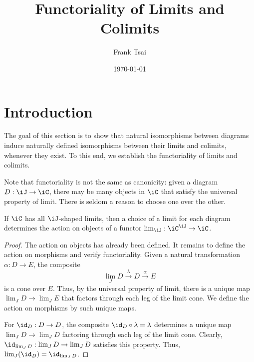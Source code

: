 \documentclass{amsart}
\title{Functoriality of Limits and Colimits}
\author{Frank Tsai}
\date{\today}
\begin{document}
\maketitle
\tableofcontents

\section{Introduction}
\label{sec:introduction}
The goal of this section is to show that natural isomorphisms between diagrams induce naturally defined isomorphisms between their limits and colimits, whenever they exist.
To this end, we establish the functoriality of limits and colimits.

Note that functoriality is not the same as canonicity: given a diagram $D : \iJ \to \iC$, there may be many objects in $\iC$ that satisfy the universal property of limit.
There is seldom a reason to choose one over the other.

\begin{thm}
  If $\iC$ has all $\iJ$-shaped limits, then a choice of a limit for each diagram determines the action on objects of a functor $\lim_{\iJ} : \iC^{\iJ} \to \iC$.
\end{thm}
\begin{proof}
  The action on objects has already been defined.
  It remains to define the action on morphisms and verify functoriality.
  Given a natural transformation $\alpha : D \to E$, the composite
  \[
    \lim_{J}D \overset{\lambda}{\to} D \overset{\alpha}{\to} E
  \]
  is a cone over $E$.
  Thus, by the universal property of limit, there is a unique map $\lim_{J}D \to \lim_{J}E$ that factors through each leg of the limit cone.
  We define the action on morphisms by such unique maps.

  For $\id_{D} : D \to D$, the composite $\id_{D} \circ \lambda = \lambda$ determines a unique map $\lim_{J}D \to \lim_{J}D$ factoring through each leg of the limit cone.
  Clearly, $\id_{\lim_{J}D}: \lim_{J}D \to \lim_{J}D$ satisfies this property.
  Thus, $\lim_{J}(\id_{D}) = \id_{\lim_{J}D}$.
  
\end{proof}


\end{document}
